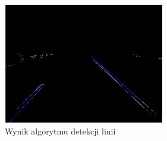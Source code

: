 \begin{figure}
  \centering
  \includegraphics[width=7cm]{img/prehough.png}
  \caption{Wynik algorytmu detekcji linii\cite{T3}}
  \label{fig:result}
\end{figure}



%
%
%
%
%
%
%

